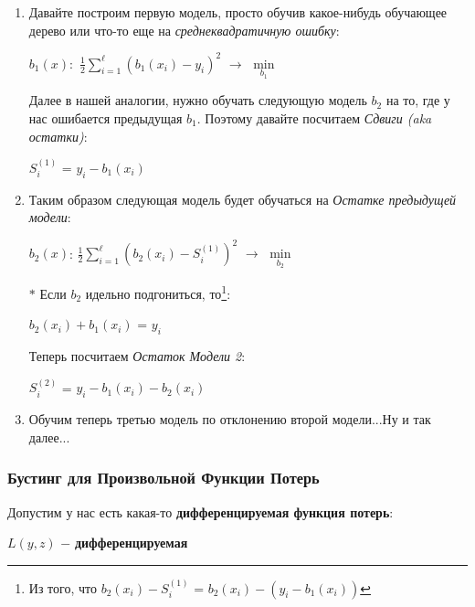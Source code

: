         \begin{enumerate}
            \item Давайте построим первую модель, просто обучив какое-нибудь обучающее дерево или что-то еще на \textit{среднеквадратичную ошибку}:
                \begin{center}
                    $b_1(x):$ \quad $\frac{1}{2}\sum\limits_{i = 1}^\ell(b_1(x_i) - y_i)^2$ $\longrightarrow$ $\min\limits_{b_1}$
                \end{center}
        
                Далее в нашей аналогии, нужно обучать следующую модель $b_2$ на то, где у нас ошибается предыдущая $b_1$. Поэтому давайте посчитаем \textit{Сдвиги (aka остатки)}:
                \begin{center}
                    $S_i^{(1)}$ = $y_i - b_1(x_i)$
                \end{center}


            \item 
                Таким образом следующая модель будет обучаться на \textit{Остатке предыдущей модели}:
                \begin{center}
                \large
                    $b_2(x)$: \quad $\frac{1}{2}\sum\limits_{i = 1}^\ell(b_2(x_i) - S_i^{(1)})^2$ $\longrightarrow$ $\min\limits_{b_2}$
                \end{center}
        
                $\ast$ Если $b_2$ идельно подгониться, то\footnote{Из того, что $b_2(x_i) - S_i^{(1)}$ = $b_2(x_i) - (y_i - b_1(x_i))$}:
                \begin{center}
                     $b_2(x_i) + b_1(x_i)$ = $y_i$
                \end{center}

                Теперь посчитаем \textit{Остаток Модели 2}:
                \begin{center}
                    $S_i^{(2)}$ = $y_i - b_1(x_i) - b_2(x_i)$
                \end{center}

            \item Обучим теперь третью модель по отклонению второй модели...Ну и так далее...
        \end{enumerate}

    \subsubsection{Бустинг для Произвольной Функции Потерь}
        Допустим у нас есть какая-то \textbf{дифференцируемая функция потерь}:
        \begin{center}
            $L(y, z)$ $-$ \textbf{дифференцируемая}
        \end{center}

